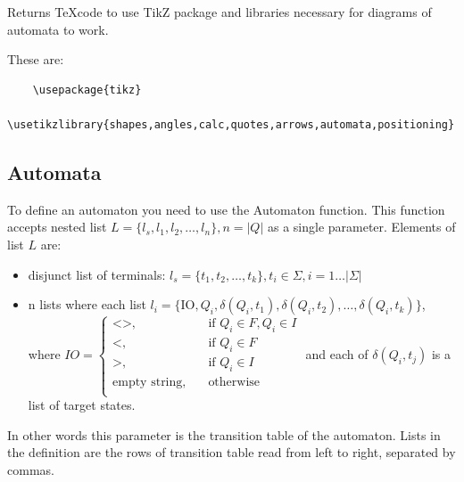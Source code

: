 \documentclass{ctuthesis}
\begin{document}
Returns \TeX code to use TikZ package and libraries necessary for diagrams of automata to work.

These are:
\begin{verbatim}
	\usepackage{tikz}
	\usetikzlibrary{shapes,angles,calc,quotes,arrows,automata,positioning}
\end{verbatim}

\subsection{Automata}
\label{subsec:automata-variables}
To define an automaton you need to use the Automaton function. This function accepts nested list $L = \{l_s, l_1, l_2, \ldots, l_n\}, n = |Q|$ as a single parameter. Elements of list $L$ are:
\begin{itemize}
	\item disjunct list of terminals: $l_s = \{t_1, t_2, \ldots, t_k\}, t_i \in \Sigma, i = 1\ldots |\Sigma|$
	\item n lists where each list $l_i = \{\text{IO}, Q_i, \delta(Q_i, t_1), \delta(Q_i, t_2), \ldots, \delta(Q_i, t_k)\}$, where $IO = 
		\begin{cases}
			\text{<>,} &\quad\text{if }Q_i \in F, Q_i \in I \\
			\text{<,} &\quad\text{if }Q_i \in F\\
			\text{>,} &\quad\text{if }Q_i \in I \\
			\text{empty string,} &\quad\text{otherwise}\\
		\end{cases}$
		and each of $\delta(Q_i, t_j)$ is a list of target states.
\end{itemize}

In other words this parameter is the transition table of the automaton. Lists in the definition are the rows of transition table read from left to right, separated by commas.
\end{document}
